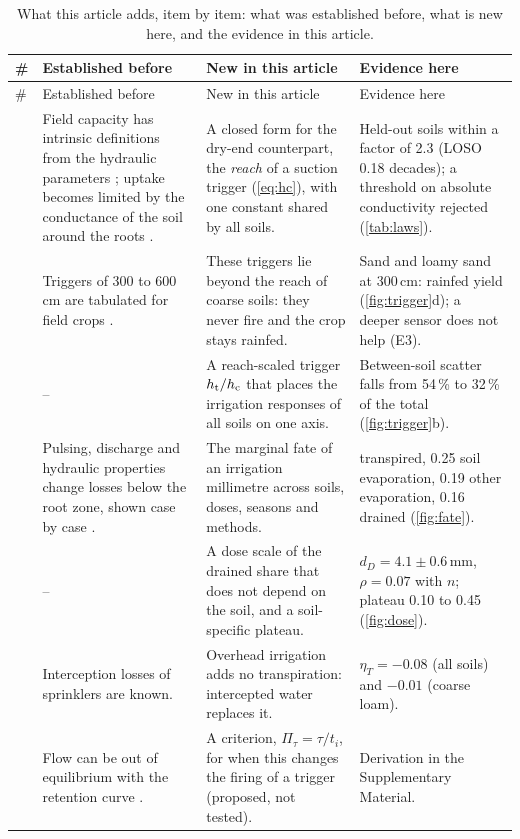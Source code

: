 {\small\setlength{\tabcolsep}{4pt}
\begin{longtable}{@{}>{\raggedright\arraybackslash}p{0.4cm}>{\raggedright\arraybackslash}p{4.5cm}>{\raggedright\arraybackslash}p{5.4cm}>{\raggedright\arraybackslash}p{5.0cm}@{}}
\caption{What this article adds, item by item: what was established before, what is new here, and the evidence in this article.}\label{tab:novelty}\\
\toprule
\# & Established before & New in this article & Evidence here\\\midrule\endfirsthead
\toprule \# & Established before & New in this article & Evidence here\\\midrule\endhead
1 & Field capacity has intrinsic definitions from the hydraulic parameters \citep{Twarakavi2009,Assouline2014}; uptake becomes limited by the conductance of the soil around the roots \citep{Gardner1960,Carminati2020}. & A closed form for the dry-end counterpart, the \emph{reach} of a suction trigger (\cref{eq:hc}), with one constant shared by all soils. & Held-out soils within a factor of 2.3 (LOSO 0.18 decades); a threshold on absolute conductivity rejected (\cref{tab:laws}).\\
2 & Triggers of 300 to 600\,cm are tabulated for field crops \citep{Allen1998}. & These triggers lie beyond the reach of coarse soils: they never fire and the crop stays rainfed. & Sand and loamy sand at 300\,cm: rainfed yield (\cref{fig:trigger}d); a deeper sensor does not help (E3).\\
3 & -- & A reach-scaled trigger $h_{\mathrm{t}}/h_{\mathrm{c}}$ that places the irrigation responses of all soils on one axis. & Between-soil scatter falls from 54\,\% to 32\,\% of the total (\cref{fig:trigger}b).\\
4 & Pulsing, discharge and hydraulic properties change losses below the root zone, shown case by case \citep{Elmaloglou2007,Elmaloglou2008,Elmaloglou2009b}. & The marginal fate of an irrigation millimetre across soils, doses, seasons and methods. & 0.38 transpired, 0.25 soil evaporation, 0.19 other evaporation, 0.16 drained (\cref{fig:fate}).\\
5 & -- & A dose scale of the drained share that does not depend on the soil, and a soil-specific plateau. & $d_D=4.1\pm0.6$\,mm, $\rho=0.07$ with $n$; plateau 0.10 to 0.45 (\cref{fig:dose}).\\
6 & Interception losses of sprinklers are known. & Overhead irrigation adds no transpiration: intercepted water replaces it. & $\eta_T=-0.08$ (all soils) and $-0.01$ (coarse loam).\\
7 & Flow can be out of equilibrium with the retention curve \citep{RossSmettem2000,Diamantopoulos2012VZJ}. & A criterion, $\Pi_\tau=\tau/t_i$, for when this changes the firing of a trigger (proposed, not tested). & Derivation in the Supplementary Material.\\
\bottomrule
\end{longtable}}
